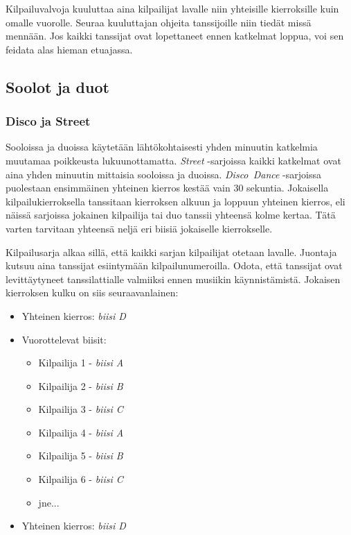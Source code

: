 \documentclass[12pt, a4paper, oneside]{article}
\begin{document}
Kilpailuvalvoja kuuluttaa aina kilpailijat lavalle niin yhteisille kierroksille kuin omalle vuorolle. Seuraa kuuluttajan ohjeita tanssijoille niin tiedät missä mennään. Jos kaikki tanssijat ovat lopettaneet ennen katkelmat loppua, voi sen feidata alas hieman etuajassa.

\subsection{Soolot ja duot}

\subsubsection{Disco ja Street}

Sooloissa ja duoissa käytetään lähtökohtaisesti yhden minuutin katkelmia muutamaa poikkeusta lukuunottamatta. \textit{Street} -sarjoissa kaikki katkelmat ovat aina yhden minuutin mittaisia sooloissa ja duoissa. \textit{Disco~Dance} -sarjoissa puolestaan ensimmäinen yhteinen kierros kestää vain 30 sekuntia. Jokaisella kilpailukierroksella tanssitaan kierroksen alkuun ja loppuun yhteinen kierros, eli näissä sarjoissa jokainen kilpailija tai duo tanssii yhteensä kolme kertaa. Tätä varten tarvitaan yhteensä neljä eri biisiä jokaiselle kierrokselle.

Kilpailusarja alkaa sillä, että kaikki sarjan kilpailijat otetaan lavalle. Juontaja kutsuu aina tanssijat esiintymään kilpailunumeroilla. Odota, että tanssijat ovat levittäytyneet tanssilattialle valmiiksi ennen musiikin käynnistämistä. Jokaisen kierroksen kulku on siis seuraavanlainen:

\begin{itemize}[nosep]
    \item Yhteinen kierros: \textit{biisi D}
    \item Vuorottelevat biisit:
          \begin{itemize}
              \item Kilpailija 1 - \textit{biisi A}
              \item Kilpailija 2 - \textit{biisi B}
              \item Kilpailija 3 - \textit{biisi C}
              \item Kilpailija 4 - \textit{biisi A}
              \item Kilpailija 5 - \textit{biisi B}
              \item Kilpailija 6 - \textit{biisi C}
              \item jne...
          \end{itemize}
    \item Yhteinen kierros: \textit{biisi D}
\end{itemize}
\end{document}
